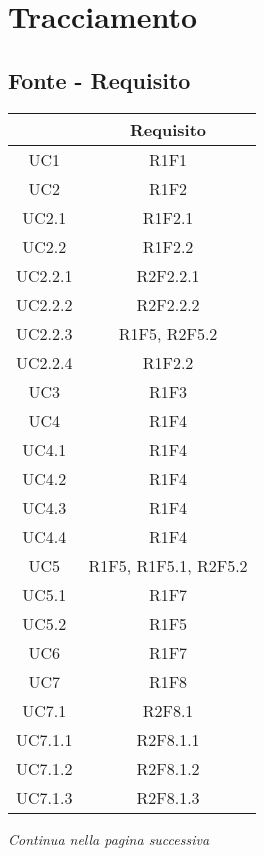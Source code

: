 \section{Tracciamento} \label{section: tracciamento}

\subsection{Fonte - Requisito}\label{subsection: fonti}

\begin{table}[H]
	\centering
	\renewcommand{\arraystretch}{1.8}
	\begin{tabular}{c | c}
		\rowcolor[HTML]{125E28}
		\multicolumn{1}{c}{\color[HTML]{FFFFFF} \textbf{Fonte}} &
		\multicolumn{1}{c}{\color[HTML]{FFFFFF} \textbf{Requisito}} \\
		\hline
		UC1 & R1F1 \\ \hline
		UC2 & R1F2 \\ \hline
		UC2.1 & R1F2.1 \\ \hline
		UC2.2 & R1F2.2 \\ \hline
		UC2.2.1 & R2F2.2.1 \\ \hline
		UC2.2.2 & R2F2.2.2 \\ \hline
		UC2.2.3 & R1F5, R2F5.2 \\ \hline
		UC2.2.4 & R1F2.2 \\ \hline
		UC3 & R1F3 \\ \hline
		UC4 & R1F4 \\ \hline
		UC4.1 & R1F4 \\ \hline
		UC4.2 & R1F4 \\ \hline
		UC4.3 & R1F4 \\ \hline
		UC4.4 & R1F4 \\ \hline
		UC5 & R1F5, R1F5.1, R2F5.2 \\ \hline
		UC5.1 & R1F7 \\ \hline
		UC5.2 & R1F5 \\ \hline
		UC6 & R1F7 \\ \hline
		UC7 & R1F8 \\ \hline
		UC7.1 & R2F8.1 \\ \hline
		UC7.1.1 & R2F8.1.1 \\ \hline
		UC7.1.2 & R2F8.1.2 \\ \hline
		UC7.1.3 & R2F8.1.3 \\ \hline
	\end{tabular}
\end{table}
\begin{center}
    \textit{\small Continua nella pagina successiva}
\end{center}
